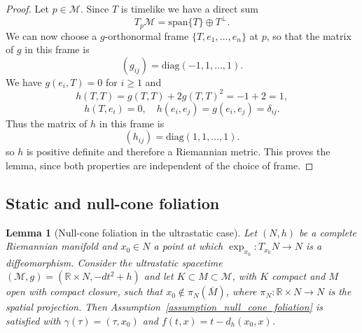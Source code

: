 \documentclass[12pt,reqno]{amsart}
\numberwithin{equation}{section}
\theoremstyle{definition}
\theoremstyle{plain}
\newtheorem{lemma}[theorem]{Lemma}
\theoremstyle{definition}
\theoremstyle{definition}
\newcommand{\M}{\mathcal{M}}
\newcommand{\uu}{M}
\begin{document}
\begin{proof}
Let $p \in \M$. Since $T$ is timelike we have a direct sum
\[
T_p \M = \mathrm{span}\{T\} \oplus  T^\perp.
\]
We can now choose a $g$-orthonormal frame $\{T, e_1, \dots, e_n\}$ at $p$, so that the matrix of $g$ in this frame is
\[
(g_{ij}) = \mathrm{diag}(-1,1,\dots,1).
\]
We have $g(e_i,T)=0$ for $i \ge 1$ and
\[
h(T,T) = g(T,T) + 2 g(T,T)^2 = -1 + 2 = 1,
\]
\[
h(T,e_i) = 0,
\quad
h(e_i,e_j) = g(e_i,e_j) = \delta_{ij}.
\]
Thus the matrix of $h$ in this frame is
\[
(h_{ij}) = \mathrm{diag}(1,1,\dots,1).
\]
so $h$ is positive definite and therefore a Riemannian metric.
This proves the lemma, since both properties are independent of the choice of frame.
\end{proof}


\subsection{Static and null-cone foliation}

\begin{lemma}[Null-cone foliation in the ultrastatic case]
\label{lem:ultrastatic-foliation}
Let $(N,h)$ be a complete Riemannian manifold and $x_0\in N$ a point
at which $\exp_{x_0}\colon T_{x_0}N\to N$ is a diffeomorphism.
Consider the ultrastatic spacetime $(\mathcal{M},g)=(\mathbb{R}\times N,-dt^2+h)$
and let $K\subset\uu\subset\mathcal{M}$, with $K$ compact and $\uu$ open with compact closure, such that $x_0\notin\pi_N(\overline\uu)$,
where $\pi_N\colon\mathbb{R}\times N\to N$ is the spatial projection.
Then Assumption~\ref{assumption_null_cone_foliation} is satisfied with
$\gamma(\tau)=(\tau,x_0)$ and $f(t,x)=t-d_h(x_0,x)$.
\end{lemma}
\end{document}

